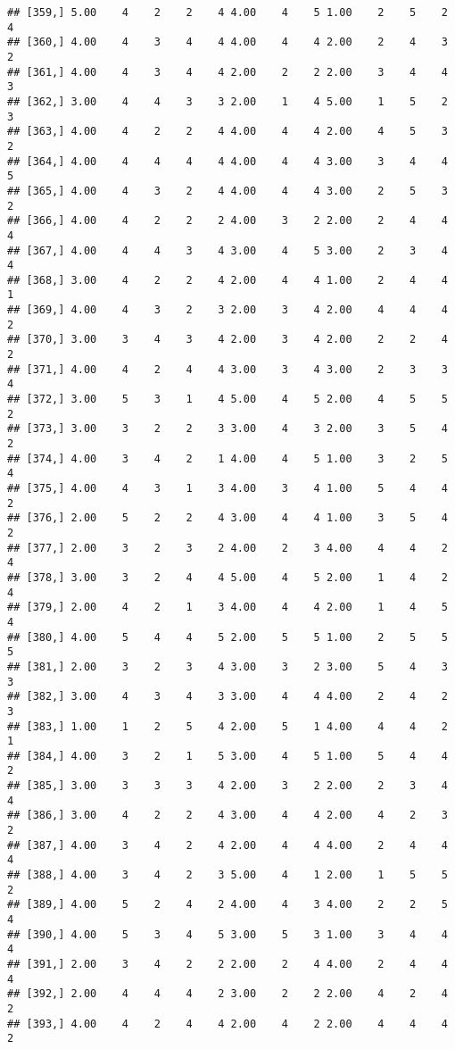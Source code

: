 \documentclass[]{article}
\begin{document}
\begin{verbatim}
## [359,] 5.00    4    2    2    4 4.00    4    5 1.00    2    5    2    4
## [360,] 4.00    4    3    4    4 4.00    4    4 2.00    2    4    3    2
## [361,] 4.00    4    3    4    4 2.00    2    2 2.00    3    4    4    3
## [362,] 3.00    4    4    3    3 2.00    1    4 5.00    1    5    2    3
## [363,] 4.00    4    2    2    4 4.00    4    4 2.00    4    5    3    2
## [364,] 4.00    4    4    4    4 4.00    4    4 3.00    3    4    4    5
## [365,] 4.00    4    3    2    4 4.00    4    4 3.00    2    5    3    2
## [366,] 4.00    4    2    2    2 4.00    3    2 2.00    2    4    4    4
## [367,] 4.00    4    4    3    4 3.00    4    5 3.00    2    3    4    4
## [368,] 3.00    4    2    2    4 2.00    4    4 1.00    2    4    4    1
## [369,] 4.00    4    3    2    3 2.00    3    4 2.00    4    4    4    2
## [370,] 3.00    3    4    3    4 2.00    3    4 2.00    2    2    4    2
## [371,] 4.00    4    2    4    4 3.00    3    4 3.00    2    3    3    4
## [372,] 3.00    5    3    1    4 5.00    4    5 2.00    4    5    5    2
## [373,] 3.00    3    2    2    3 3.00    4    3 2.00    3    5    4    2
## [374,] 4.00    3    4    2    1 4.00    4    5 1.00    3    2    5    4
## [375,] 4.00    4    3    1    3 4.00    3    4 1.00    5    4    4    2
## [376,] 2.00    5    2    2    4 3.00    4    4 1.00    3    5    4    2
## [377,] 2.00    3    2    3    2 4.00    2    3 4.00    4    4    2    4
## [378,] 3.00    3    2    4    4 5.00    4    5 2.00    1    4    2    4
## [379,] 2.00    4    2    1    3 4.00    4    4 2.00    1    4    5    4
## [380,] 4.00    5    4    4    5 2.00    5    5 1.00    2    5    5    5
## [381,] 2.00    3    2    3    4 3.00    3    2 3.00    5    4    3    3
## [382,] 3.00    4    3    4    3 3.00    4    4 4.00    2    4    2    3
## [383,] 1.00    1    2    5    4 2.00    5    1 4.00    4    4    2    1
## [384,] 4.00    3    2    1    5 3.00    4    5 1.00    5    4    4    2
## [385,] 3.00    3    3    3    4 2.00    3    2 2.00    2    3    4    4
## [386,] 3.00    4    2    2    4 3.00    4    4 2.00    4    2    3    2
## [387,] 4.00    3    4    2    4 2.00    4    4 4.00    2    4    4    4
## [388,] 4.00    3    4    2    3 5.00    4    1 2.00    1    5    5    2
## [389,] 4.00    5    2    4    2 4.00    4    3 4.00    2    2    5    4
## [390,] 4.00    5    3    4    5 3.00    5    3 1.00    3    4    4    4
## [391,] 2.00    3    4    2    2 2.00    2    4 4.00    2    4    4    4
## [392,] 2.00    4    4    4    2 3.00    2    2 2.00    4    2    4    2
## [393,] 4.00    4    2    4    4 2.00    4    2 2.00    4    4    4    2

\end{verbatim}
\end{document}
